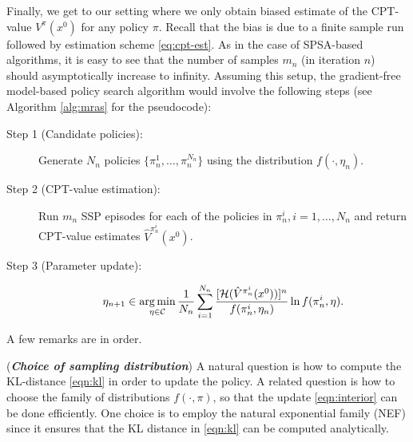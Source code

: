 \documentclass[11pt,letterpaper,english]{article}
\begin{document}
                    
Finally, we get to our setting where we only obtain biased estimate of the CPT-value $V^\pi(x^0)$ for any policy $\pi$. Recall that the bias is due to a finite sample run followed by estimation scheme \eqref{eq:cpt-est}. As in the case of SPSA-based algorithms, it is easy to see that the number of samples $m_n$ (in iteration $n$) should asymptotically increase to infinity. Assuming this setup, the gradient-free model-based policy search algorithm would involve the following steps (see Algorithm \ref{alg:mras} for the pseudocode):

\begin{description}
 \item[Step 1 (Candidate policies):] Generate $N_n$ policies $\{\pi^1_n, \ldots, \pi^{N_n}_n\}$ using the distribution $f(\cdot,\eta_n)$.

\item[Step 2 (CPT-value estimation):] Run $m_n$ SSP episodes for each of the policies in $\pi^i_n, i=1,\ldots, N_n$ and return CPT-value estimates $\hat V^{\pi^i_n}(x^0)$.

\item[Step 3 (Parameter update):]
                         \begin{equation} \label{eqn:step4}
                           \eta_{n+1} \in \mathop{\rm arg\,min}_{\eta \in \mathcal{C}}\frac{1}{N_n}\sum_{i=1}^{N_n}\frac{[\mathcal{H}(\hat V^{\pi^i_n}(x^0))]^n}{ f(\pi_n^i,\eta_n)}\ln f(\pi_n^i,\eta).
                            \end{equation}

\end{description}

                    
A few remarks are in order.
\begin{remark}(\textbf{\textit{Choice of sampling distribution}})
A natural question is how to compute the KL-distance \eqref{eqn:kl} in order to update the policy. A related question is how to choose the family of distributions $f(\cdot,\pi)$, so that the update \eqref{eqn:interior} can be done efficiently. One choice is to employ the natural exponential family (NEF) since it ensures that the KL distance in \eqref{eqn:kl} can be computed analytically. %
\end{remark}
\end{document}
